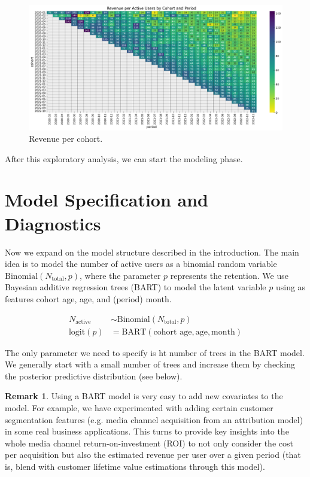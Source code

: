 \documentclass[11pt]{amsart}
\theoremstyle{definition}
\newtheorem{remark}{Remark}
\begin{document}
\begin{figure}
    \centering
    \includegraphics[width=\textwidth]{images/revenue_retention_25_0.png}
    \caption{Revenue per cohort.}
    \label{fig:revenue_per_active_user}
\end{figure}

After this exploratory analysis, we can start the modeling phase.

\section{Model Specification and Diagnostics}

Now we expand on the model structure described in the introduction. The main idea is to
model the number of active users as a binomial random variable
$\text{Binomial}(N_{\text{total}}, p)$, where the parameter $p$ represents the retention.
We use Bayesian additive regression trees (BART) to model the latent variable $p$ using
as features cohort age, age, and (period) month. 

\begin{align*}
    N_{\text{active}} & \sim \text{Binomial}(N_{\text{total}}, p) \\
    \textrm{logit}(p) & = \text{BART}(\text{cohort age}, \text{age}, \text{month})
\end{align*}

The only parameter we need to specify is ht number of trees in the BART model. We
generally start with a small number of trees and increase them by checking the posterior
predictive distribution (see below).

\begin{remark}
Using a BART model is very easy to add new covariates to the model. For example, we have
experimented with adding certain customer segmentation features (e.g. media channel
acquisition from an attribution model) in some real business applications. This turns to
provide key insights into the whole media channel return-on-investment (ROI) to not only
consider the cost per acquisition but also the estimated revenue per user over a given
period (that is, blend with customer lifetime value estimations through this model).
\end{remark}
\end{document}
